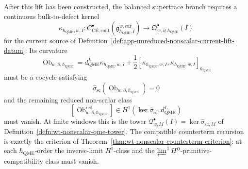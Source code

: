 \documentclass[11pt]{memoir}
\begin{document}
\begin{prob}
  After this lift has been constructed, the balanced supertrace branch
  requires a continuous bulk-to-defect kernel
  \[
	    \kappa_{\hbar_{\mathrm{QME}},w,I}\colon
	    C^\bullet_{\mathrm{CE},\mathrm{cont}}
	    (\mathfrak g^{w,\mathrm{cur}}_{\hbar_{\mathrm{QME}},I})
    \longrightarrow
    \mathfrak Q^\bullet_{w,\partial,\hbar_{\mathrm{QME}}}(I)
  \]
  for the current source of
  Definition~\ref{def:app-unreduced-nonscalar-current-lift-datum}.  Its
  curvature
  \[
	    \operatorname{Ob}_{w,\partial,\hbar_{\mathrm{QME}}}
	      =
	      d_{\mathrm{QME}}^{L}\kappa_{\hbar_{\mathrm{QME}},w,I}
	      +\frac12[\kappa_{\hbar_{\mathrm{QME}},w,I},\kappa_{\hbar_{\mathrm{QME}},w,I}]_{\hbar_{\mathrm{QME}}}
  \]
  must be a cocycle satisfying
  \[
    \widehat\sigma_{\mathrm{sc}}
	      (\operatorname{Ob}_{w,\partial,\hbar_{\mathrm{QME}}})=0
  \]
  and the remaining reduced non-scalar class
  \[
    [\operatorname{Ob}^{\mathrm{red}}_{w,\partial,\hbar_{\mathrm{QME}}}]
      \in
      H^1\!\left(
        \ker\widehat\sigma_{\mathrm{sc}},
        d_{\mathrm{QME}}^{L}
      \right)
  \]
  must vanish.  At finite windows this is the tower
  \(\mathcal Q^\bullet_{w,M}(I)=\ker\widehat\sigma_{\mathrm{sc},M}\) of
  Definition~\ref{defn:wt-nonscalar-qme-tower}.  The compatible
  counterterm recursion is exactly the criterion of
  Theorem~\ref{thm:wt-nonscalar-counterterm-criterion}: at each
  \(\hbar_{\mathrm{QME}}\)-order the inverse-limit \(H^1\)-class and the
  \(\varprojlim^1 H^0\)-primitive-compatibility class must vanish.


\end{prob}
\end{document}
